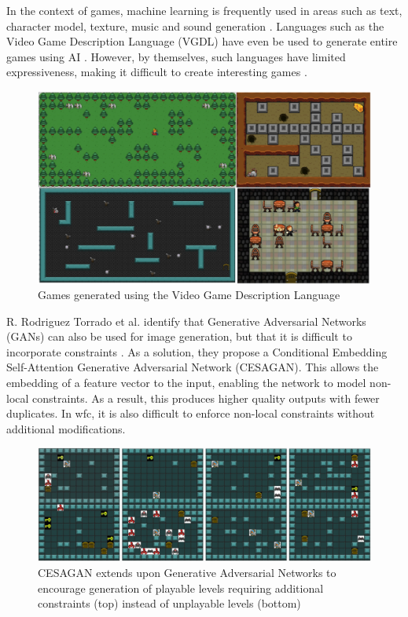 In the context of games, machine learning is frequently used in areas such as text, character model, texture, music and sound generation \cite{DeepLearningPCG}. Languages such as the Video Game Description Language (VGDL) have even be used to generate entire games using AI \cite{VGDL, VGDL_ASP}. However, by themselves, such languages have limited expressiveness, making it difficult to create interesting games \cite{VGDL}.

\begin{figure}[H]
    \centering
    \includegraphics[width=\textwidth, height=0.3\textheight, keepaspectratio]{Images/VGDL.jpg}
    \caption{Games generated using the Video Game Description Language \cite{VGDL}}
    \label{fig:vgdl}
\end{figure}

R. Rodriguez Torrado et al. identify that Generative Adversarial Networks (GANs) can also be used for image generation, but that it is difficult to incorporate constraints \cite{CESAGAN}. As a solution, they propose a Conditional Embedding Self-Attention Generative Adversarial Network (CESAGAN). This allows the embedding of a feature vector to the input, enabling the network to model non-local constraints. As a result, this produces higher quality outputs with fewer duplicates. In \acrshort{wfc}, it is also difficult to enforce non-local constraints without additional modifications.

\begin{figure}[H]
    \centering
    \includegraphics[width=\textwidth, height=0.3\textheight, keepaspectratio]{Images/CESAGAN.jpg}
    \caption{CESAGAN extends upon Generative Adversarial Networks to encourage generation of playable levels requiring additional constraints (top) instead of unplayable levels (bottom) \cite{CESAGAN}}
    \label{fig:cesagan}
\end{figure}

